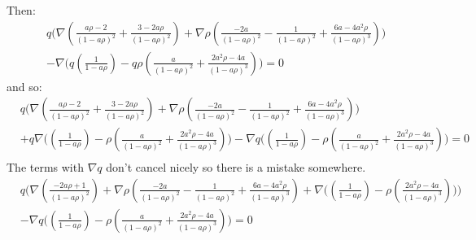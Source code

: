 \documentclass[11pt, a4paper]{article}
\theoremstyle{definition}
\begin{document}
Then:
\begin{align*}
	&q \bigg( \nabla \left(\frac{a \rho  - 2}{(1- a \rho)^2} + \frac{3-2a\rho}{(1-a\rho)^2} \right) + \nabla \rho  \left( \frac{-2a }{(1-a\rho)^2} - \frac{1}{(1 -a \rho)^2} + \frac{6a-4a^2  \rho}{(1-a\rho)^3}  \right)\bigg)\\
	& -  \nabla \bigg(q \left(\frac{1}{1- a\rho} \right)  - q\rho  \left(\frac{a }{(1-a\rho)^2} + \frac{2a^2\rho -4a}{(1-a\rho)^3} \right) \bigg) = 0	
\end{align*}
and so:
\begin{align*}
	&q \bigg( \nabla \left(\frac{a \rho  - 2}{(1- a \rho)^2} + \frac{3-2a\rho}{(1-a\rho)^2} \right) + \nabla \rho  \left( \frac{-2a }{(1-a\rho)^2} - \frac{1}{(1 -a \rho)^2} + \frac{6a-4a^2  \rho}{(1-a\rho)^3}  \right)\bigg)\\
	& + q \nabla \bigg( \left(\frac{1}{1- a\rho} \right)  - \rho  \left(\frac{a }{(1-a\rho)^2} + \frac{2a^2\rho -4a}{(1-a\rho)^3} \right) \bigg) -  \nabla q\bigg( \left(\frac{1}{1- a\rho} \right)  - \rho  \left(\frac{a }{(1-a\rho)^2} + \frac{2a^2\rho -4a}{(1-a\rho)^3} \right) \bigg)  = 0	\\
\end{align*}
The terms with $\nabla q$ don't cancel nicely so there is a mistake somewhere.
\begin{align*}
	&q \bigg( \nabla \left(\frac{-2a \rho  +1}{(1- a \rho)^2} \right) + \nabla \rho  \left( \frac{-2a }{(1-a\rho)^2} - \frac{1}{(1 -a \rho)^2} + \frac{6a-4a^2  \rho}{(1-a\rho)^3}  \right) +\nabla \bigg( \left(\frac{1}{1- a\rho} \right)  - \rho  \left( \frac{2a^2\rho -4a}{(1-a\rho)^3} \right) \bigg) \bigg)\\
	&-  \nabla q\bigg( \left(\frac{1}{1- a\rho} \right)  - \rho  \left(\frac{a }{(1-a\rho)^2} + \frac{2a^2\rho -4a}{(1-a\rho)^3} \right) \bigg)  = 0	\\
\end{align*}
	
\end{document}
